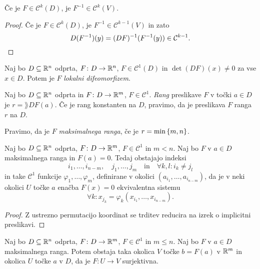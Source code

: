 \begin{opomba}
Če je $F \in \mathcal{C}^k(D)$, je $F^{-1} \in \mathcal{C}^k(V)$.
\end{opomba}

\begin{proof}
Če je $F \in \mathcal{C}^k(D)$, je
$F^{-1} \in \mathcal{C}^{k-1}(V)$ in zato
\[
D(F^{-1})(y) = (DF)^{-1}(F^{-1}(y)) \in \mathcal{C}^{k-1}. \qedhere
\]
\end{proof}

\begin{opomba}
Naj bo $D \subseteq \mathbb{R}^n$ odprta, $F \colon D \to \mathbb{R}^n$,
$F \in \mathcal{C}^1(D)$ in $\det(DF)(x) \ne 0$ za vse $x \in D$.
Potem je $F$ \emph{lokalni difeomorfizem}.
\end{opomba}


\begin{definicija}
Naj bo $D \subseteq \mathbb{R}^n$ odprta in $F \colon D \to \mathbb{R}^m$,
$F \in \mathcal{C}^1$. \emph{Rang}
preslikave $F$ v točki $a \in D$ je $r = \rang DF(a)$. Če je rang
konstanten na $D$, pravimo, da je preslikava $F$ ranga $r$ na $D$.
\end{definicija}

\begin{opomba}
Pravimo, da je $F$ \emph{maksimalnega ranga}, če je
$r = \min\left\{m,n\right\}$. 
\end{opomba}

\begin{posledica}
Naj bo $D \subseteq \mathbb{R}^n$ odprta, $F \colon D \to \mathbb{R}^m$,
$F \in \mathcal{C}^1$ in $m < n$. Naj bo $F$ v $a \in D$
maksimalnega ranga in $F(a)=0$. Tedaj obstajajo indeksi
\[
i_1,\dots,i_{n-m}, \quad j_1,\dots,j_m \quad \text{in} \quad
\forall k,l \colon i_k \ne j_l
\]
in take $\mathcal{C}^1$ funkcije $\varphi_1,\dots,\varphi_m$,
definirane v okolici $(a_{i_1},\dots,a_{i_{n-m}})$, da je v neki
okolici $U$ točke $a$ enačba $F(x)=0$ ekvivalentna sistemu
\[
\forall k \colon x_{j_k} = \varphi_k(x_{i_1},\dots,x_{i_{n-m}}).
\]
\end{posledica}

\begin{proof}
Z ustrezno permutacijo koordinat se trditev reducira na izrek
o implicitni preslikavi.
\end{proof}

\begin{posledica}
Naj bo $D \subseteq \mathbb{R}^n$ odprta, $F \colon D \to \mathbb{R}^m$,
$F \in \mathcal{C}^1$ in $m \leq n$. Naj bo $F$ v $a \in D$
maksimalnega ranga. Potem obstaja taka okolica $V$ točke $b = F(a)$
v $\mathbb{R}^m$ in okolica $U$ točke $a$ v $D$, da je $F \colon U \to V$
surjektivna.
\end{posledica}

